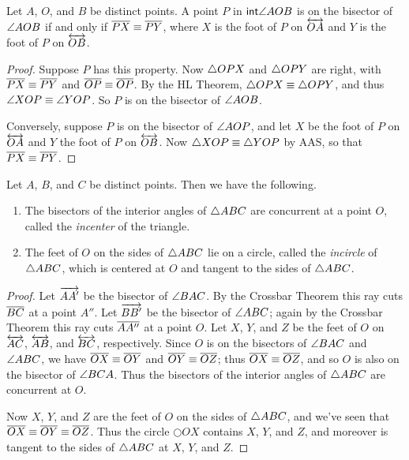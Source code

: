 \begin{prop}
Let $A$, $O$, and $B$ be distinct points. A point $P$ in $\mathsf{int}\angle{AOB}$ is on the bisector of $\angle{AOB}$ if and only if $\overline{PX} \equiv \overline{PY}$, where $X$ is the foot of $P$ on $\overleftrightarrow{OA}$ and $Y$ is the foot of $P$ on $\overleftrightarrow{OB}$.
\end{prop}

\begin{proof}
Suppose $P$ has this property. Now $\bigtriangleup{OPX}$ and $\bigtriangleup{OPY}$ are right, with $\overline{PX} \equiv \overline{PY}$ and $\overline{OP} \equiv \overline{OP}$. By the HL Theorem, $\bigtriangleup{OPX} \equiv \bigtriangleup{OPY}$, and thus $\angle{XOP} \equiv \angle{YOP}$. So $P$ is on the bisector of $\angle{AOB}$.

Conversely, suppose $P$ is on the bisector of $\angle{AOP}$, and let $X$ be the foot of $P$ on $\overleftrightarrow{OA}$ and $Y$ the foot of $P$ on $\overleftrightarrow{OB}$. Now $\bigtriangleup{XOP} \equiv \bigtriangleup{YOP}$ by AAS, so that $\overline{PX} \equiv \overline{PY}$. 
\end{proof}

\begin{construct}
Let $A$, $B$, and $C$ be distinct points. Then we have the following.
\begin{enumerate}
\item The bisectors of the interior angles of $\bigtriangleup{ABC}$ are concurrent at a point $O$, called the \emph{incenter} of the triangle.

\item The feet of $O$ on the sides of $\bigtriangleup{ABC}$ lie on a circle, called the \emph{incircle} of $\bigtriangleup{ABC}$, which is centered at $O$ and tangent to the sides of $\bigtriangleup{ABC}$.
\end{enumerate}
\end{construct}

\begin{proof}
Let $\overrightarrow{AA'}$ be the bisector of $\angle{BAC}$. By the Crossbar Theorem this ray cuts $\overline{BC}$ at a point $A''$. Let $\overrightarrow{BB'}$ be the bisector of $\angle{ABC}$; again by the Crossbar Theorem this ray cuts $\overline{AA''}$ at a point $O$. Let $X$, $Y$, and $Z$ be the feet of $O$ on $\overleftrightarrow{AC}$, $\overleftrightarrow{AB}$, and $\overleftrightarrow{BC}$, respectively. Since $O$ is on the bisectors of $\angle{BAC}$ and $\angle{ABC}$, we have $\overline{OX} \equiv \overline{OY}$ and $\overline{OY} \equiv \overline{OZ}$; thus $\overline{OX} \equiv \overline{OZ}$, and so $O$ is also on the bisector of $\angle{BCA}$. Thus the bisectors of the interior angles of $\bigtriangleup{ABC}$ are concurrent at $O$.

Now $X$, $Y$, and $Z$ are the feet of $O$ on the sides of $\bigtriangleup{ABC}$, and we've seen that $\overline{OX} \equiv \overline{OY} \equiv \overline{OZ}$. Thus the circle $\Circle{O}{X}$ contains $X$, $Y$, and $Z$, and moreover is tangent to the sides of $\bigtriangleup{ABC}$ at $X$, $Y$, and $Z$.
\end{proof}

